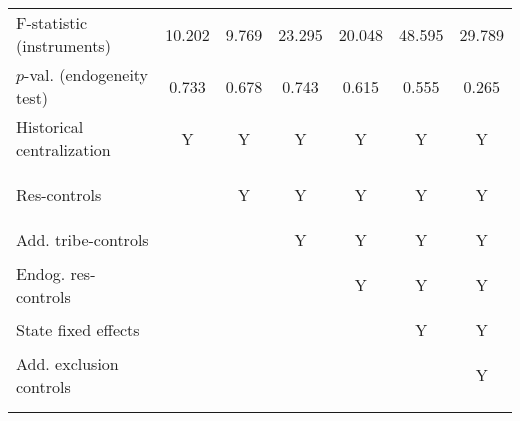 \begin{center}
\begin{tabular}{lcccccc}
\noalign{\smallskip}F-statistic (instruments) & 10.202 & 9.769 & 23.295 & 20.048 & 48.595 & 29.789\\
\noalign{\smallskip}$ p$-val. (endogeneity test) & 0.733 & 0.678 & 0.743 & 0.615 & 0.555 & 0.265\\
\noalign{\smallskip}Historical centralization & Y & Y & Y & Y & Y & Y\\
Res-controls & \begin{footnotesize}\end{footnotesize} & \begin{footnotesize}Y\end{footnotesize} & \begin{footnotesize}Y\end{footnotesize} & \begin{footnotesize}Y\end{footnotesize} & \begin{footnotesize}Y\end{footnotesize} & \begin{footnotesize}Y\end{footnotesize}\\
Add. tribe-controls &  &  & Y & Y & Y & Y\\
Endog. res-controls & \begin{footnotesize}\end{footnotesize} & \begin{footnotesize}\end{footnotesize} & \begin{footnotesize}\end{footnotesize} & \begin{footnotesize}Y\end{footnotesize} & \begin{footnotesize}Y\end{footnotesize} & \begin{footnotesize}Y\end{footnotesize}\\
State fixed effects &  &  &  &  & Y & Y\\
Add. exclusion controls & \begin{footnotesize}\end{footnotesize} & \begin{footnotesize}\end{footnotesize} & \begin{footnotesize}\end{footnotesize} & \begin{footnotesize}\end{footnotesize} & \begin{footnotesize}\end{footnotesize} & \begin{footnotesize}Y\end{footnotesize}\\
\noalign{\smallskip}\hline\hline\end{tabular}\\
\end{center}
